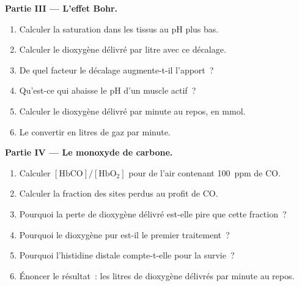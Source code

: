 \begin{problem}
\medskip\noindent\textbf{Partie III --- L'effet Bohr.}
\begin{enumerate}[resume]
  \item Calculer la saturation dans les tissus au pH plus bas.
  \item Calculer le dioxygène délivré par litre avec ce décalage.
  \item De quel facteur le décalage augmente-t-il l'apport~?
  \item Qu'est-ce qui abaisse le pH d'un muscle actif~?
  \item Calculer le dioxygène délivré par minute au repos, en mmol.
  \item Le convertir en litres de gaz par minute.
\end{enumerate}

\medskip\noindent\textbf{Partie IV --- Le monoxyde de carbone.}
\begin{enumerate}[resume]
  \item Calculer $[\mathrm{HbCO}]/[\mathrm{HbO_2}]$ pour de l'air contenant \qty{100}{ppm} de CO.
  \item Calculer la fraction des sites perdus au profit de CO.
  \item Pourquoi la perte de dioxygène délivré est-elle pire que cette
        fraction~?
  \item Pourquoi le dioxygène pur est-il le premier traitement~?
  \item Pourquoi l'histidine distale compte-t-elle pour la survie~?
  \item Énoncer le résultat~: les litres de dioxygène délivrés par minute au
        repos.
\end{enumerate}
\end{problem}
